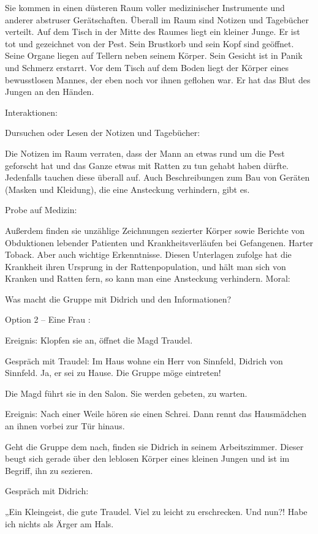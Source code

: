 Sie kommen in einen düsteren Raum voller medizinischer Instrumente und anderer abstruser Gerätschaften. Überall im Raum sind Notizen und Tagebücher verteilt. Auf dem Tisch in der Mitte des Raumes liegt ein kleiner Junge. Er ist tot und gezeichnet von der Pest. Sein Brustkorb und sein Kopf sind geöffnet. Seine Organe liegen auf Tellern neben seinem Körper. Sein Gesicht ist in Panik und Schmerz erstarrt. Vor dem Tisch auf dem Boden liegt der Körper eines bewusstlosen Mannes, der eben noch vor ihnen geflohen war. Er hat das Blut des Jungen an den Händen.

Interaktionen:

Dursuchen oder Lesen der Notizen und Tagebücher:

Die Notizen im Raum verraten, dass der Mann an etwas rund um die Pest geforscht hat und das Ganze etwas mit Ratten zu tun gehabt haben dürfte. Jedenfalls tauchen diese überall auf. Auch Beschreibungen zum Bau von Geräten (Masken und Kleidung), die eine Ansteckung verhindern, gibt es.

Probe auf Medizin:

Außerdem finden sie unzählige Zeichnungen sezierter Körper sowie Berichte von Obduktionen lebender Patienten und Krankheitsverläufen bei Gefangenen. Harter Toback. Aber auch wichtige Erkenntnisse. Diesen Unterlagen zufolge hat die Krankheit ihren Ursprung in der Rattenpopulation, und hält man sich von Kranken und Ratten fern, so kann man eine Ansteckung verhindern.
Moral:

Was macht die Gruppe mit Didrich und den Informationen?

Option 2 – Eine Frau
:

Ereignis: Klopfen sie an, öffnet die Magd Traudel.

Gespräch mit Traudel: Im Haus wohne ein Herr von Sinnfeld, Didrich von Sinnfeld. Ja, er sei zu Hause. Die Gruppe möge eintreten!

Die Magd führt sie in den Salon. Sie werden gebeten, zu warten.

Ereignis: Nach einer Weile hören sie einen Schrei. Dann rennt das Hausmädchen an ihnen vorbei zur Tür hinaus.

Geht die Gruppe dem nach, finden sie Didrich in seinem Arbeitszimmer. Dieser beugt sich gerade über den leblosen Körper eines kleinen Jungen und ist im Begriff, ihn zu sezieren.

Gespräch mit Didrich:

„Ein Kleingeist, die gute Traudel. Viel zu leicht zu erschrecken. Und nun?! Habe ich nichts als Ärger am Hals.

